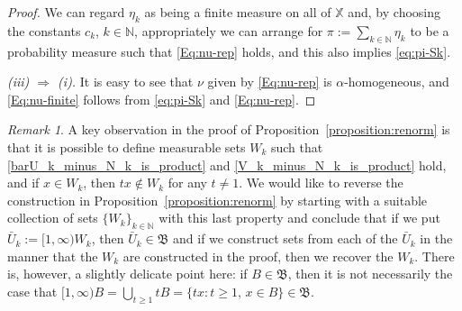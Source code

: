 \documentclass[12pt]{amsart}
\numberwithin{equation}{section}
\numberwithin{figure}{section}
\theoremstyle{plain} \newtheorem{theorem}{Theorem}[section]
\theoremstyle{plain} \newtheorem{proposition}[theorem]{Proposition}
\theoremstyle{plain} \newtheorem{lemma}[theorem]{Lemma}
\theoremstyle{plain} \newtheorem{corollary}[theorem]{Corollary}
\theoremstyle{definition} \newtheorem{definition}[theorem]{Definition}
\theoremstyle{definition} \newtheorem{notation}[theorem]{Notation}
\theoremstyle{remark} \newtheorem{remark}[theorem]{Remark}
\theoremstyle{remark} \newtheorem{example}[theorem]{Example}
\theoremstyle{definition} \newtheorem{assumption}{Assumption}
\newcommand{\bN}{\mathbb{N}}
\newcommand{\bX}{\mathbb{X}}
\newcommand{\salg}{\mathfrak{B}}
\begin{document}
\begin{proof}
  We can regard $\eta_k$ as being a finite measure on all of $\bX$
  and, by choosing the constants $c_k$, $k \in \bN$, appropriately we
  can arrange for $\pi := \sum_{k \in \bN} \eta_k$ to be a probability
  measure such that \eqref{Eq:nu-rep} holds, and this also implies
  \eqref{eq:pi-Sk}.

  \textsl{(iii) $\Longrightarrow$ (i).}  It is easy to see that $\nu$
  given by \eqref{Eq:nu-rep} is $\alpha$-homogeneous, and
  \eqref{Eq:nu-finite} follows from \eqref{eq:pi-Sk} and
  \eqref{Eq:nu-rep}.
\end{proof}

\begin{remark}
  A key observation in the proof of
  Proposition~\ref{proposition:renorm} is that it is possible to
  define measurable sets $W_k$ such that
  \eqref{barU_k_minus_N_k_is_product} and
  \eqref{V_k_minus_N_k_is_product} hold, and if $x \in W_k$, then $t x
  \notin W_k$ for any $t \ne 1$.  We would like to reverse the
  construction in Proposition~\ref{proposition:renorm} by starting
  with a suitable collection of sets $\{W_k\}_{k\in\bN}$ with this
  last property and conclude that if we put $\bar U_k := [1,\infty)
  W_k$, then $\bar U_k \in \salg$ and if we construct sets from each
  of the $\bar U_k$ in the manner that the $W_k$ are constructed in
  the proof, then we recover the $W_k$.  There is, however, a slightly
  delicate point here: if $B \in \salg$, then it is not necessarily
  the case that $[1,\infty) B = \bigcup_{t \ge 1} t B = \{t x: t \ge
  1, \, x \in B\} \in \salg$.
\end{remark}
\end{document}
